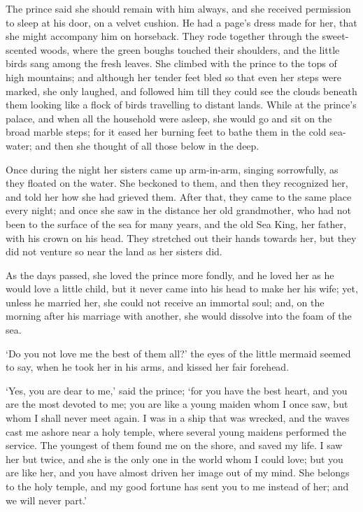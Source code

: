 The prince said she should remain with him always, and she received permission to sleep at his door, on a velvet cushion.
He had a page’s dress made for her, that she might accompany him on horseback.
They rode together through the sweet-scented woods, where the green boughs touched their shoulders, and the little birds sang among the fresh leaves.
She climbed with the prince to the tops of high mountains; and although her tender feet bled so that even her steps were marked, she only laughed, and followed him till they could see the clouds beneath them looking like a flock of birds travelling to distant lands.
While at the prince’s palace, and when all the household were asleep, she would go and sit on the broad marble steps; for it eased her burning feet to bathe them in the cold sea-water; and then she thought of all those below in the deep.

Once during the night her sisters came up arm-in-arm, singing sorrowfully, as they floated on the water.
She beckoned to them, and then they recognized her, and told her how she had grieved them.
After that, they came to the same place every night; and once she saw in the distance her old grandmother, who had not been to the surface of the sea for many years, and the old Sea King, her father, with his crown on his head.
They stretched out their hands towards her, but they did not venture so near the land as her sisters did.

As the days passed, she loved the prince more fondly, and he loved her as he would love a little child, but it never came into his head to make her his wife; yet, unless he married her, she could not receive an immortal soul; and, on the morning after his marriage with another, she would dissolve into the foam of the sea.

`Do you not love me the best of them all?' the eyes of the little mermaid seemed to say, when he took her in his arms, and kissed her fair forehead.

`Yes, you are dear to me,' said the prince; `for you have the best heart, and you are the most devoted to me; you are like a young maiden whom I once saw, but whom I shall never meet again.
I was in a ship that was wrecked, and the waves cast me ashore near a holy temple, where several young maidens performed the service.
The youngest of them found me on the shore, and saved my life.
I saw her but twice, and she is the only one in the world whom I could love; but you are like her, and you have almost driven her image out of my mind.
She belongs to the holy temple, and my good fortune has sent you to me instead of her; and we will never part.'

